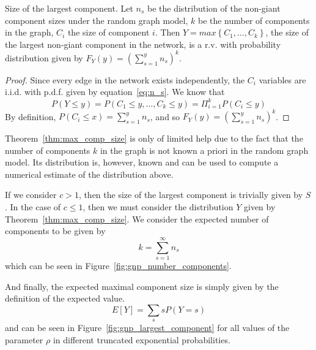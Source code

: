 \begin{theorem}{Size of the largest component.}
\label{thm:max_comp_size}
Let $n_s$ be the distribution of the non-giant component sizes under the random graph model, $k$ be the number of components in the graph, $C_i$ the size of component $i$.
Then $Y=max\left\{ C_1,\ldots,C_k\right\}$, the size of the largest non-giant component in the network, is a r.v. with probability distribution given by
$F_Y(y) = (\sum_{s=1}^{y} n_s)^k$.
\end{theorem}
\begin{proof}
Since every edge in the network exists independently, the $C_i$ variables are i.i.d. with p.d.f. given by equation~\ref{eq:n_s}.
We know that 
$$P(Y\le y) = P (C_1 \le y, \ldots , C_k \le y) = \Pi_{i=1}^{k} P(C_i \le y)$$
By definition, $P(C_i \le x) = \sum_{s=1}^y n_s$, and so $F_Y(y) = \left( \sum_{s=1}^y n_s \right)^k$.
\end{proof}
\vspace{0.3cm}
\begin{remark}
Theorem~\vref{thm:max_comp_size} is only of limited help due to the fact that the number of components $k$ in the graph is not known a priori in the random graph model.
Its distribution is, however, known and can be used to compute a numerical estimate of the distribution above.
\end{remark}

If we consider $c > 1$, then the size of the largest component is trivially given by $S$.
In the case of $c \le 1$, then we must consider the distribution $Y$ given by Theorem~\ref{thm:max_comp_size}.
We consider the expected number of components to be given by
\begin{equation}
	k = \sum_{s=1}^{\infty} n_s
\end{equation}
which can be seen in Figure~\ref{fig:gnp_number_components}.


And finally, the expected maximal component size is simply given by the definition of the expected value.
\begin{equation}
	E[Y] = \sum_s s P(Y=s)
	\label{eq:e_y}
\end{equation}
and can be seen in Figure~\ref{fig:gnp_largest_component} for all values of  the parameter $\rho$ in different truncated exponential probabilities.

